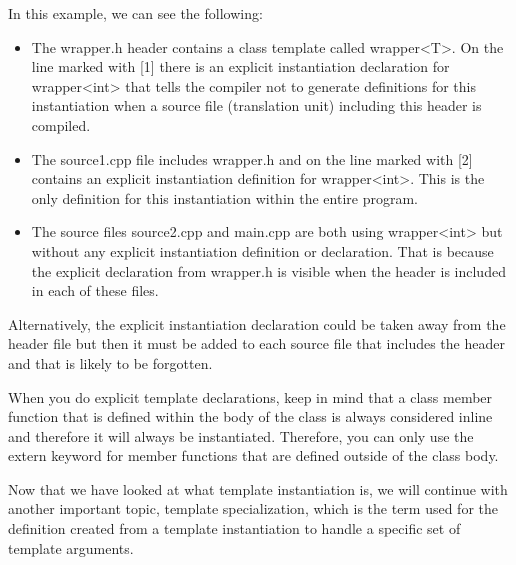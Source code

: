 In this example, we can see the following:

\begin{itemize}
\item 
The wrapper.h header contains a class template called wrapper<T>. On the line marked with [1] there is an explicit instantiation declaration for wrapper<int> that tells the compiler not to generate definitions for this instantiation when a source file (translation unit) including this header is compiled.

\item 
The source1.cpp file includes wrapper.h and on the line marked with [2] contains an explicit instantiation definition for wrapper<int>. This is the only definition for this instantiation within the entire program.

\item 
The source files source2.cpp and main.cpp are both using wrapper<int> but without any explicit instantiation definition or declaration. That is because the explicit declaration from wrapper.h is visible when the header is included in each of these files.
\end{itemize}

Alternatively, the explicit instantiation declaration could be taken away from the header file but then it must be added to each source file that includes the header and that is likely to be forgotten.

When you do explicit template declarations, keep in mind that a class member function that is defined within the body of the class is always considered inline and therefore it will always be instantiated. Therefore, you can only use the extern keyword for member functions that are defined outside of the class body.

Now that we have looked at what template instantiation is, we will continue with another important topic, template specialization, which is the term used for the definition created from a template instantiation to handle a specific set of template arguments.















